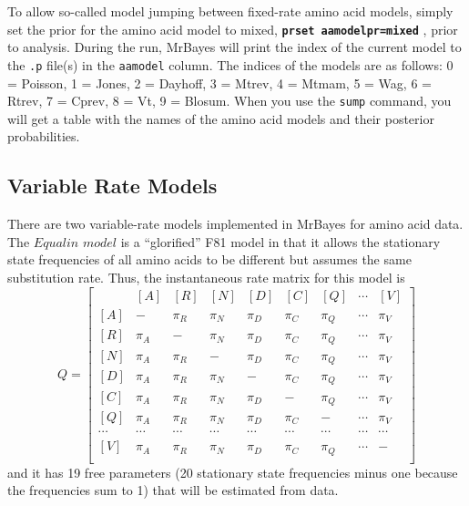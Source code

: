 \documentclass[12pt]{book}
\newcommand{\ttt}[1]{\texttt{#1} }
\newcommand{\tb}[1]{\texttt{\textbf{#1}} }
\begin{document}
To allow so-called model jumping between fixed-rate amino acid models, simply set the
prior for the amino acid model to mixed, \tb{prset aamodelpr=mixed}, prior to
analysis. During the run, MrBayes will print the index of the current model to the \ttt{.p}
file(s) in the \ttt{aamodel} column. The indices of the models are as follows: 0 = Poisson, 1
= Jones, 2 = Dayhoff, 3 = Mtrev, 4 = Mtmam, 5 = Wag, 6 = Rtrev, 7 = Cprev, 8 = Vt, 9 =
Blosum. When you use the \ttt{sump} command, you will get a table with the names of the
amino acid models and their posterior probabilities.

\subsection{Variable Rate Models}
There are two variable-rate models implemented in MrBayes for amino acid data. The
$Equalin$ $model$ is a ``glorified'' F81 model in that it allows the stationary state frequencies
of all amino acids to be different but assumes the same substitution rate. Thus, the
instantaneous rate matrix for this model is
\[
Q=\begin{bmatrix}
    & [A] & [R] & [N] & [D] & [C] & [Q] & \cdots & [V]\\ 
 [A]& - & \pi_{R} & \pi_{N} & \pi_{D}& \pi_{C}& \pi_{Q} & \cdots & \pi_V\\ 
 [R]& \pi_{A} &- &  \pi_{N} & \pi_{D}& \pi_{C}& \pi_{Q} & \cdots & \pi_V\\ 
 [N]& \pi_{A} &\pi_{R} &- &   \pi_{D}& \pi_{C}& \pi_{Q} & \cdots & \pi_V\\ 
 [D]& \pi_{A} &\pi_{R} &  \pi_{N}&- &  \pi_{C}& \pi_{Q} & \cdots & \pi_V\\ 
 [C]& \pi_{A} &\pi_{R} &  \pi_{N}&  \pi_{D}&- & \pi_{Q} & \cdots & \pi_V\\ 
 [Q]& \pi_{A} &\pi_{R} &  \pi_{N}&  \pi_{D}& \pi_{C} &- & \cdots & \pi_V\\  
 \cdots& \cdots& \cdots& \cdots& \cdots& \cdots& \cdots& \cdots& \cdots\\
 [V]& \pi_{A} &\pi_{R} &  \pi_{N}&  \pi_{D}& \pi_{C} &\pi_Q & \cdots &- \\ 
\end{bmatrix}
\]
and it has 19 free parameters (20 stationary state frequencies minus one because the
frequencies sum to 1) that will be estimated from data.
\end{document}

